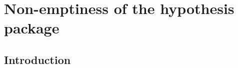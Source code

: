 \section{Non-emptiness of the hypothesis package}\label{sec:pf:stageU}

\providecommand{\stageUA}{\mathcal{A}}
\providecommand{\stageUC}{\mathcal{C}}
\providecommand{\stageUFm}{\mathcal{F}}
\providecommand{\stageULk}{\mathrm{Lk}}
\providecommand{\stageUKP}{\mathrm{KP}}
\providecommand{\stageUBd}{\mathrm{Bd}}
\providecommand{\stageUQO}{\mathrm{QO}}
\providecommand{\stageUDR}{\mathrm{DR}}
\providecommand{\stageUNN}{\mathcal{N}}
\providecommand{\stageUand}{\mathbin{\wedge}}
\providecommand{\stageUEv}{\mathrm{Ev}}
\providecommand{\stageULg}{\mathrm{Lg}}
\providecommand{\stageUBu}{\mathrm{Bu}}
\providecommand{\stageUSel}{\mathrm{Sel}}
\providecommand{\stageULin}{\mathrm{Lin}}
\providecommand{\stageULB}{\mathrm{LB}}
\providecommand{\stageUEx}{\mathrm{Ex}}
\providecommand{\stageUDes}{\mathrm{Des}}
\providecommand{\stageULay}{\mathrm{Lay}}
\providecommand{\stageUPts}{\mathrm{Pts}}
\providecommand{\stageUKits}{\mathrm{Kits}}
\providecommand{\stageUHosts}{\mathrm{Hosts}}
\providecommand{\stageUE}{\mathcal{E}}
\providecommand{\stageUpd}{p_{\mathrm{dep}}}
\providecommand{\stageUpA}{p_{A}}

\subsection{Introduction}\label{sec:pf:stageU:intro}

